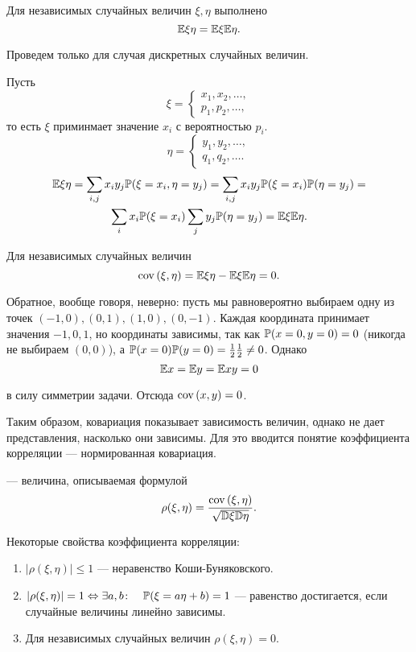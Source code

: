 \documentclass[../TV&MS.tex]{subfiles}
\begin{document}
\begin{St}
	Для независимых случайных величин $\xi, \eta$ выполнено
	$$\mathbb{E}\xi\eta = \mathbb{E}\xi\mathbb{E}\eta.$$
\end{St}
\begin{Proof}
	Проведем только для случая дискретных случайных величин.
	
	Пусть 
\[
   	\xi = 
  	\begin{cases}
  		x_1, x_2, \ldots, \\
  		p_1, p_2, \ldots,
  	\end{cases}
\]
	то есть $\xi$ приминмает значение $x_i$ с вероятностью $p_i$.
\[
   	\eta = 
  	\begin{cases}
  		y_1, y_2, \ldots,\\
  		q_1, q_2, \ldots.
  	\end{cases}
\]
\begin{multline*}
	\mathbb{E}\xi\eta=\sum\limits_{i,j} x_iy_j\mathbb{P}(\xi=x_i, \eta=y_j) = 
	\sum\limits_{i,j} x_iy_j\mathbb{P}(\xi=x_i)\mathbb{P}(\eta=y_j) = \\  
	\sum\limits_{i} x_i\mathbb{P}(\xi=x_i)\sum\limits_j y_j\mathbb{P}(\eta=y_j) = 
	\mathbb{E}\xi\mathbb{E}\eta.
\end{multline*}
\end{Proof}

Для независимых случайных величин
$${\rm cov \,}(\xi,\eta) = \mathbb{E}\xi\eta - \mathbb{E}\xi\mathbb{E}\eta = 0.$$

Обратное, вообще говоря, неверно: пусть мы равновероятно выбираем 
одну из точек $(-1, 0), (0, 1), (1, 0), (0, -1)$. Каждая координата 
принимает значения $-1, 0, 1$, но координаты зависимы, так как 
$\mathbb{P}(x=0,  y=0) = 0$ (никогда не выбираем $(0,0)$), а 
$\mathbb{P}(x=0)\mathbb{P}(y=0) = \frac12\frac12 \not=0$. Однако
$$\mathbb{E} x = \mathbb{E} y = \mathbb{E} xy = 0$$ 

\noindent
в силу симметрии задачи. Отсюда ${\rm cov \,}(x,y) = 0$.

Таким образом, ковариация показывает зависимость величин, 
однако не дает представления, насколько они зависимы. Для это вводится 
понятие коэффициента корреляции --- нормированная ковариация.

\begin{Def}
 --- величина, описываемая формулой
$$\rho(\xi, \eta) = \frac{{\rm cov \,}(\xi, \eta)}{\sqrt{\mathbb{D}\xi\mathbb{D}\eta}}.$$
\end{Def}

Некоторые свойства коэффициента корреляции:
\begin{enumerate}
	\item $|\rho(\xi, \eta)| \le 1$ --- неравенство Коши-Буняковского.
	\item $|\rho(\xi, \eta)| = 1 \Leftrightarrow \exists a, b \colon 
	\quad \mathbb{P}(\xi = a\eta + b) = 1$ --- равенство достигается, 
	если случайные величины линейно зависимы.
	
	\item Для независимых случайных величин $\rho(\xi, \eta) = 0$.
\end{enumerate} 
\end{document}
